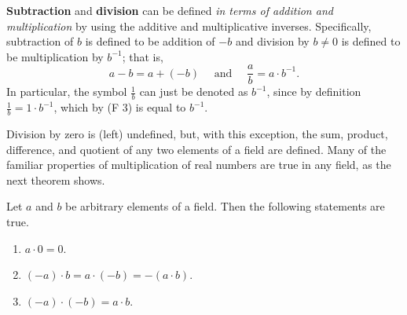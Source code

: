 \begin{remark} \label{remark c.2}
\textbf{Subtraction} and \textbf{division} can be defined \emph{in terms of addition and multiplication} by using the additive and multiplicative inverses.
Specifically, subtraction of \(b\) is defined to be addition of \(-b\) and division by \(b \ne 0\) is defined to be multiplication by \(b^{-1}\);
that is,
\[
    a - b = a + (-b) \quad \text{ and } \quad \frac{a}{b} = a \cdot b^{-1}.
\]
In particular, the symbol \(\frac{1}{b}\) can just be denoted as \(b^{-1}\), since by definition \(\frac{1}{b} = 1 \cdot b^{-1}\), which by (F 3) is equal to \(b^{-1}\).

Division by zero is (left) undefined, but, with this exception, the sum, product, difference, and quotient of any two elements of a field are defined.
Many of the familiar properties of multiplication of real numbers are true in any field, as the next theorem shows.
\end{remark}

\begin{appendix theorem} \label{thm c.2}
Let \(a\) and \(b\) be arbitrary elements of a field.
Then the following statements are true.
\begin{enumerate}
\item \(a \cdot 0 = 0\).
\item \((-a) \cdot b = a \cdot (-b) = -(a \cdot b)\).
\item \((-a) \cdot (-b) = a \cdot b\).
\end{enumerate}
\end{appendix theorem}

